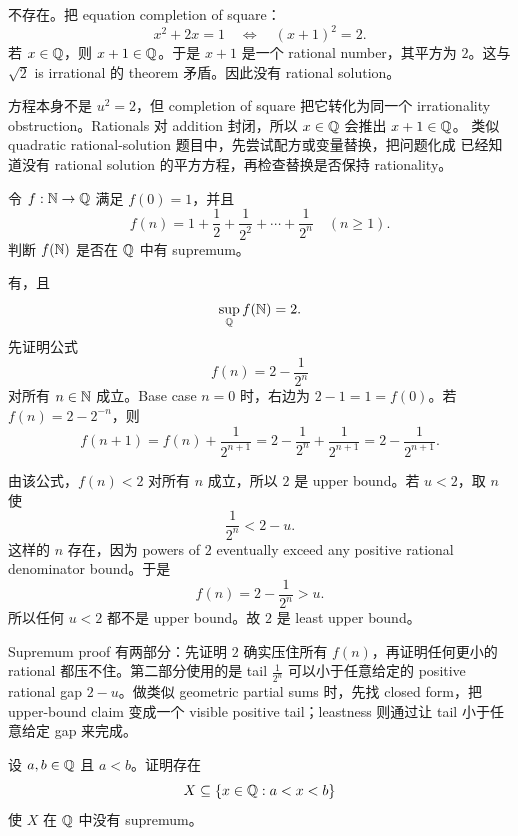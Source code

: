 \begin{solution}
不存在。把 equation completion of square：
\[
  x^2+2x=1
  \quad\Longleftrightarrow\quad
  (x+1)^2=2.
\]
若 \(x\in\mathbb{Q}\)，则 \(x+1\in\mathbb{Q}\)。于是 \(x+1\) 是一个 rational number，其平方为
\(2\)。这与 \(\sqrt2\) is irrational 的 theorem 矛盾。因此没有 rational
solution。
\end{solution}

\begin{explanation}
方程本身不是 \(u^2=2\)，但 completion of square 把它转化为同一个 irrationality
obstruction。Rationals 对 addition 封闭，所以 \(x\in\mathbb{Q}\) 会推出 \(x+1\in\mathbb{Q}\)。
类似 quadratic rational-solution 题目中，先尝试配方或变量替换，把问题化成
已经知道没有 rational solution 的平方方程，再检查替换是否保持 rationality。
\end{explanation}

\begin{exerciseblock}
令 \(f:\mathbb{N}\to\mathbb{Q}\) 满足 \(f(0)=1\)，并且
\[
  f(n)=1+\frac12+\frac1{2^2}+\cdots+\frac1{2^n}\quad(n\geq1).
\]
判断 \(f(\mathbb{N})\) 是否在 \(\mathbb{Q}\) 中有 supremum。
\end{exerciseblock}

\begin{solution}
有，且
\[
  \sup_{\mathbb{Q}} f(\mathbb{N})=2.
\]
先证明公式
\[
  f(n)=2-\frac1{2^n}
\]
对所有 \(n\in\mathbb{N}\) 成立。Base case \(n=0\) 时，右边为 \(2-1=1=f(0)\)。若
\(f(n)=2-2^{-n}\)，则
\[
  f(n+1)=f(n)+\frac1{2^{n+1}}
  =2-\frac1{2^n}+\frac1{2^{n+1}}
  =2-\frac1{2^{n+1}}.
\]

由该公式，\(f(n)<2\) 对所有 \(n\) 成立，所以 \(2\) 是 upper bound。若
\(u<2\)，取 \(n\) 使
\[
  \frac1{2^n}<2-u.
\]
这样的 \(n\) 存在，因为 powers of \(2\) eventually exceed any positive rational
denominator bound。于是
\[
  f(n)=2-\frac1{2^n}>u.
\]
所以任何 \(u<2\) 都不是 upper bound。故 \(2\) 是 least upper bound。
\end{solution}

\begin{explanation}
Supremum proof 有两部分：先证明 \(2\) 确实压住所有 \(f(n)\)，再证明任何更小的
rational 都压不住。第二部分使用的是 tail \(\frac1{2^n}\) 可以小于任意给定的
positive rational gap \(2-u\)。做类似 geometric partial sums 时，先找 closed
form，把 upper-bound claim 变成一个 visible positive tail；leastness 则通过让
tail 小于任意给定 gap 来完成。
\end{explanation}

\begin{exerciseblock}
设 \(a,b\in\mathbb{Q}\) 且 \(a<b\)。证明存在
\[
  X\subseteq\{x\in\mathbb{Q}:a<x<b\}
\]
使 \(X\) 在 \(\mathbb{Q}\) 中没有 supremum。
\end{exerciseblock}

